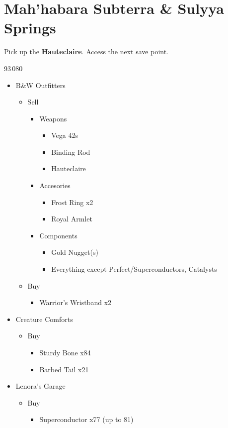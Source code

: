 \chapter{Mah'habara Subterra \& Sulyya Springs}

Pick up the \textbf{Hauteclaire}.
Access the next save point.

\begin{shop}{93\,080}
	\begin{itemize}
		\item B\&W Outfitters
			\begin{itemize}
				\item Sell
					\begin{itemize}
						\item Weapons
							\begin{itemize}
								\item Vega 42s
								\item Binding Rod
								\item Hauteclaire
							\end{itemize}
						\item Accesories
							\begin{itemize}
								\item Frost Ring x2
								\item Royal Armlet
							\end{itemize}
						\item Components
							\begin{itemize}
								\item Gold Nugget(s)
								\item Everything except Perfect/Superconductors, Catalysts
							\end{itemize}
					\end{itemize}
				\item Buy
					\begin{itemize}
						\item Warrior's Wristband x2
					\end{itemize}
			\end{itemize}
		\item Creature Comforts
			\begin{itemize}
				\item Buy
					\begin{itemize}
						\item Sturdy Bone x84
						\item Barbed Tail x21
					\end{itemize}
			\end{itemize}
		\item Lenora's Garage
			\begin{itemize}
				\item Buy
					\begin{itemize}
						\item Superconductor x77 (up to 81)
					\end{itemize}
			\end{itemize}		
	\end{itemize}
\end{shop}

